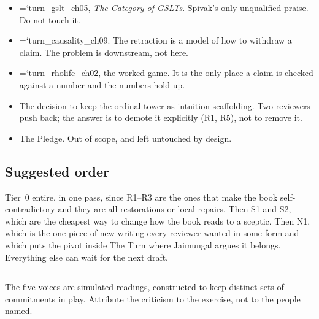 \documentclass[11pt,letterpaper]{article}
\newcommand{\loc}[1]{{\small\ttfamily\color{accent}\hyphenchar\font=`\-\relax #1}}
\begin{document}
\begin{itemize}[leftmargin=1.2em,itemsep=3pt]
\item \loc{turn\_gslt\_ch05}, \emph{The Category of GSLTs}. Spivak's
      only unqualified praise. Do not touch it.
\item \loc{turn\_causality\_ch09}. The retraction is a model of how to
      withdraw a claim. The problem is downstream, not here.
\item \loc{turn\_rholife\_ch02}, the worked game. It is the only place
      a claim is checked against a number and the numbers hold up.
\item The decision to keep the ordinal tower as intuition-scaffolding.
      Two reviewers push back; the answer is to demote it explicitly
      (R1, R5), not to remove it.
\item The Pledge. Out of scope, and left untouched by design.
\end{itemize}

\subsection*{Suggested order}

Tier~0 entire, in one pass, since R1--R3 are the ones that make the
book self-contradictory and they are all restorations or local repairs.
Then S1 and S2, which are the cheapest way to change how the book reads
to a sceptic. Then N1, which is the one piece of new writing every
reviewer wanted in some form and which puts the pivot inside The Turn
where Jaimungal argues it belongs. Everything else can wait for the
next draft.

\vspace{2em}
\hrule
\vspace{0.8em}
{\footnotesize\color{rule}
The five voices are simulated readings, constructed to keep distinct
sets of commitments in play. Attribute the criticism to the exercise,
not to the people named.}
\end{document}
